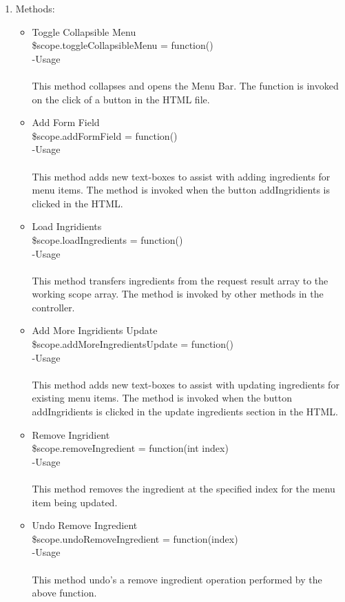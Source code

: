 \documentclass[a4paper,12pt]{report}
\begin{document}
\begin{enumerate}
\item Methods:
	\begin{itemize}
		\item Toggle Collapsible Menu\\
		\$scope.toggleCollapsibleMenu = function()\\
		-Usage\\ \\
		This method collapses and opens the Menu Bar. The function is invoked on the click of a button in the HTML file.
		\item Add Form Field\\
		\$scope.addFormField = function()\\
		-Usage\\ \\
		This method adds new text-boxes to assist with adding ingredients for menu items. The method is invoked when the button addIngridients is clicked in the HTML.
		\item Load Ingridients\\
		\$scope.loadIngredients = function()\\
		-Usage\\ \\
		This method transfers ingredients from the request result array to the working scope array. The method is invoked by other methods in the controller.
		\item Add More Ingridients Update\\
		\$scope.addMoreIngredientsUpdate = function()\\
		-Usage\\ \\
		This method adds new text-boxes to assist with updating ingredients for existing menu items. The method is invoked when the button addIngridients is clicked in the update ingredients section in the HTML.
		\item Remove Ingridient\\
		\$scope.removeIngredient = function(int index)\\
		-Usage\\ \\
		This method removes the ingredient at the specified index for the menu item being updated.
		\item Undo Remove Ingredient\\
		\$scope.undoRemoveIngredient = function(index)\\
		-Usage\\ \\
		This method undo's a remove ingredient operation performed by the above function.

\end{itemize}
\end{enumerate}
\end{document}
